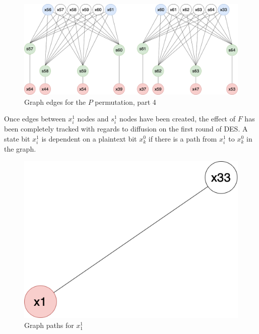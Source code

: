 \documentclass{report}
\begin{document}
\begin{figure}[h!]
    \centering
    \includegraphics[scale=0.3]{Grafo_DES-p4.png}
    \caption{Graph edges for the $P$ permutation, part 4}
    \label{fig:perm4}
\end{figure}

Once edges between $x_i^1$ nodes and $s_i^1$ nodes have been created, the effect of $F$ has been completely tracked with regards to diffusion on the first round of DES. A state bit $x_i^1$ is dependent on a plaintext bit $x_k^0$ if there is a path from $x_i^1$ to $x_k^0$ in the graph.

\begin{figure}[h!]
    \centering
    \includegraphics[scale=0.3]{Grafo_DES-node-example2.png}
    \caption{Graph paths for $x_1^1$}
    \label{fig:x1example}
\end{figure}
\end{document}
